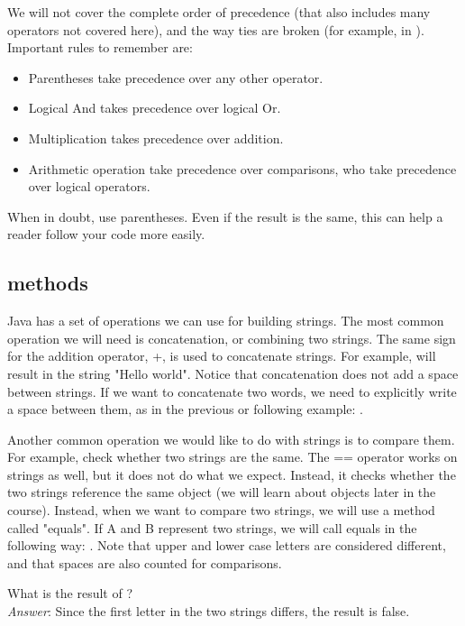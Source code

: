 We will not cover the complete order of precedence (that also includes many operators not covered here), and the way ties are broken (for example, in ). Important rules to remember are:

\begin{itemize}
\item Parentheses take precedence over any other operator.
\item Logical And takes precedence over logical Or. 
\item Multiplication takes precedence over addition.
\item Arithmetic operation take precedence over comparisons, who take precedence over logical operators.
\end{itemize}

When in doubt, use parentheses. Even if the result is the same, this can help a reader follow your code more easily. 


\subsection{ methods}

Java has a set of operations we can use for building strings. The most common operation we will need is concatenation, or combining two strings. The same sign for the addition operator, +, is used to concatenate strings. For example,  will result in the string "Hello world". Notice that concatenation does not add a space between strings. If we want to concatenate two words, we need to explicitly write a space between them, as in the previous or following example: .

Another common operation we would like to do with strings is to compare them. For example, check whether two strings are the same. The == operator works on strings as well, but it does not do what we expect. Instead, it checks whether the two strings reference the same object (we will learn about objects later in the course). Instead, when we want to compare two strings, we will use a method called "equals". If A and B represent two strings, we will call equals in the following way: . Note that upper and lower case letters are considered different, and that spaces are also counted for comparisons.


\begin{example}
What is the result of ? \\

\noindent \emph{Answer}: Since the first letter in the two strings differs, the result is false.
\end{example}



